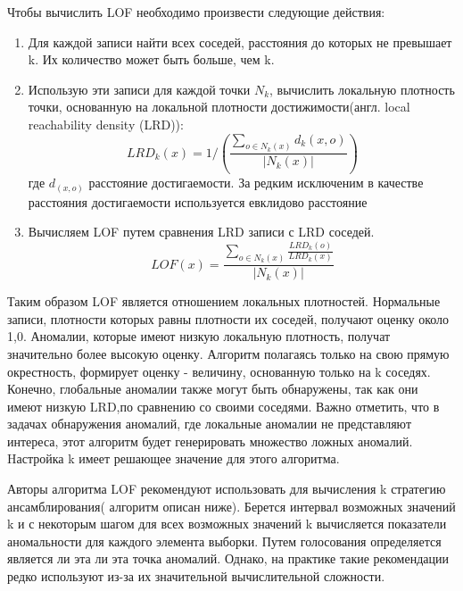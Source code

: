  Чтобы вычислить LOF необходимо произвести следующие действия:
 \begin{enumerate}
 	\item Для каждой записи найти всех соседей, расстояния до которых не превышает k. Их количество может быть больше, чем k.
 	\item Использую эти записи для каждой точки $N_k$, вычислить локальную плотность точки, основанную на локальной плотности достижимости(англ. local reachability density (LRD)):
 	\begingroup
 	\Large
 	\begin{equation}
 	LRD_k(x) = 1/(\frac{\sum_{o \in N_k(x)}d_k (x,o)}{|N_k (x)|})
 	\end{equation}
 	\endgroup
 	где \begingroup
 	\Large$d_(x,o)$ \endgroup расстояние достигаемости. За редким исключеним в качестве расстояния достигаемости используется евклидово расстояние \cite{Book12}
 	\item Вычисляем LOF путем сравнения LRD записи с LRD соседей.
 	\begingroup
 	\Large
 	\begin{equation}
 	LOF(x) = \frac{\sum_{o \in N_k(x)}\frac{LRD_k (o)}{LRD_k (x)}}{|N_k (x)|}
 	\end{equation}
 	\endgroup
 \end{enumerate}
 Таким образом LOF является отношением локальных плотностей.  Нормальные записи, плотности которых равны плотности их соседей, получают оценку около 1,0. Аномалии, которые имеют низкую локальную плотность, получат значительно более высокую оценку. Алгоритм полагаясь только на свою прямую окрестность, формирует  оценку - величину, основанную  только на k соседях. Конечно, глобальные аномалии также могут быть обнаружены, так как они  имеют низкую LRD,по сравнению со своими соседями. Важно отметить, что в задачах обнаружения аномалий, где локальные аномалии не представляют интереса, этот алгоритм будет генерировать множество ложных аномалий. Hастройка k имеет решающее значение для этого алгоритма.
 
 Авторы алгоритма LOF рекомендуют использовать  для вычисления k стратегию ансамблирования( алгоритм описан ниже). Берется интервал возможных значений k и с некоторым шагом для всех возможных значений k вычисляется показатели аномальности для каждого элемента выборки. Путем голосования определяется является ли эта ли эта точка аномалий. Однако, на практике такие рекомендации редко используют из-за их значительной вычислительной сложности.
